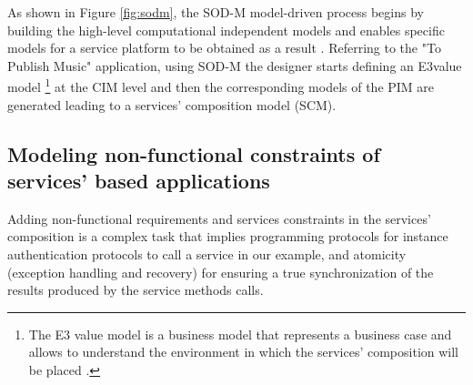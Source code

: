 As shown in Figure \ref{fig:sodm}, the SOD-M model-driven process begins by building the high-level computational independent models and enables specific models for a service platform to be obtained as a result  \cite{decastro1}. Referring to the "To Publish Music" application, using SOD-M the designer starts defining an E3value model \footnote{The E3 value model is a business model that represents a business case %
and allows  to understand the environment in which the services' composition will be placed \cite{e3value}.}  at the CIM level and then the corresponding models of the PIM are generated leading to a services' composition model (SCM).


\subsection{Modeling non-functional constraints of services' based applications}
Adding non-functional requirements and services constraints in the services' composition is a complex task that implies programming  protocols for instance authentication protocols to call a service in our example, and atomicity (exception handling and recovery) for ensuring a true synchronization of the results produced by the service methods calls.


